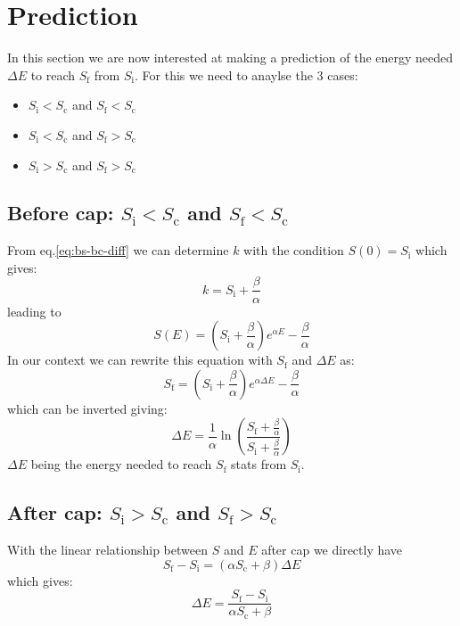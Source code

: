 \documentclass[12pt]{article}
\def\Sc{S_\text{c}}
\def\Si{S_\text{i}}
\def\Sf{S_\text{f}}
\begin{document}
\section{Prediction}
In this section we are now interested at making a prediction of the energy needed $\Delta E$ to reach $\Sf$ from $\Si$. For this we need to anaylse the 3 cases:
\begin{itemize}
    \item $\Si < \Sc$ and $\Sf < \Sc$
    \item $\Si < \Sc$ and $\Sf > \Sc$
    \item $\Si > \Sc$ and $\Sf > \Sc$
\end{itemize}
\subsection{Before cap: $\Si < \Sc$ and $\Sf < \Sc$}
From eq.\eqref{eq:bs-bc-diff} we can determine $k$ with the condition $S(0) = \Si$ which gives:
\begin{equation}
    k = \Si + \frac{\beta}{\alpha}
\end{equation}
leading to
\begin{equation}
    S(E) = \left(\Si + \frac{\beta}{\alpha}\right)e^{\alpha E} - \frac{\beta}{\alpha}
\end{equation}
In our context we can rewrite this equation with $\Sf$ and $\Delta E$ as:
\begin{equation}
    \Sf = \left(\Si + \frac{\beta}{\alpha}\right)e^{\alpha \Delta E} - \frac{\beta}{\alpha}
\end{equation}
which can be inverted giving:
\begin{equation}
    \Delta E = \frac{1}{\alpha} \ln\left( \frac{\Sf + \frac{\beta}{\alpha}}{\Si + \frac{\beta}{\alpha}} \right)
\end{equation}
$\Delta E$ being the energy needed to reach $\Sf$ stats from $\Si$.

\subsection{After cap: $\Si > \Sc$ and $\Sf > \Sc$}
With the linear relationship between $S$ and $E$ after cap we directly have
\begin{equation}
    \Sf - \Si = (\alpha \Sc + \beta) \Delta E
\end{equation}
which gives:
\begin{equation}
    \Delta E = \frac{\Sf - \Si}{\alpha \Sc + \beta}
\end{equation}
\end{document}
